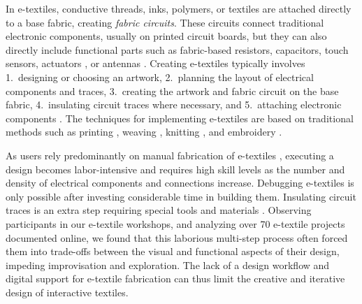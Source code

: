 \documentclass[header.tex]{subfiles}
\begin{document}
In e-textiles, conductive threads, inks, polymers, or textiles are attached directly to a base fabric, creating \textit{fabric circuits}. These circuits connect traditional electronic components, usually on printed circuit boards, but they can also directly include functional parts such as fabric-based resistors, capacitors, touch sensors, actuators \cite{stylios2007shape}, or antennas \cite{catrysse2004towards}.
Creating e-textiles typically involves 1.\ designing or choosing an artwork, 2.\ planning the layout of electrical components and traces, 3.\ creating the artwork and fabric circuit on the base fabric, 4.\ insulating circuit traces where necessary, and 5.\ attaching electronic components \cite{Lovell:2010:ETD:1810543.1810578}. 
The techniques for implementing e-textiles are based on traditional methods such as printing \cite{kim2010electrical}, weaving \cite{kallmayer2003new}, knitting \cite{farringdon1999wearable}, and  embroidery \cite{5387040}.



As users rely predominantly on manual fabrication of e-textiles \cite{Kazemitabaar:2017:MTA:3025453.3025887}, executing a design becomes labor-intensive and requires high skill levels as the number and density of electrical components and connections increase. Debugging e-textiles is only possible after investing considerable time in building them. Insulating circuit traces is an extra step requiring special tools and materials \cite{Buechley2009}. Observing participants in our e-textile workshops, and analyzing over 70 e-textile projects documented online, we found that this laborious multi-step process often forced them into trade-offs between the visual and functional aspects of their design, impeding improvisation and exploration. The lack of a design workflow and digital support for e-textile fabrication can thus limit the creative and iterative design of interactive textiles.
\end{document}
